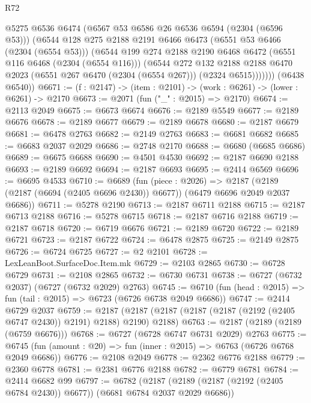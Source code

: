 \begin{lexlean}{R72}
\begin{coremodule}
            @5275
            @6536
            @6474
            (@6567 @53 @6586 @26 @6536 @6594 (@2304 (@6596 @53)))
            (@6544
              @128
              @275
              @2188
              @2191
              @6466
              @6473
              (@6551 @53 @6466 (@2304 (@6554 @53)))
              (@6544
                @199
                @274
                @2188
                @2190
                @6468
                @6472
                (@6551 @116 @6468 (@2304 (@6554 @116)))
                (@6544
                  @272
                  @132
                  @2188
                  @2188
                  @6470
                  @2023
                  (@6551 @267 @6470 (@2304 (@6554 @267)))
                  (@2324 @6515)))))))
      (@6438 @6540))
@6671 := (f : @2147) -> (item : @2101) -> (work : @6261) -> (lower : @6261) -> @2170
@6673 := @2071 (fun ("_" : @2015) => @2170)
@6674 := @2113 @2049
@6675 := @6673 @6674
@6676 := @2189 @5549
@6677 := @2189 @6676
@6678 := @2189 @6677
@6679 := @2189 @6678
@6680 := @2187 @6679
@6681 := @6478 @2763
@6682 := @2149 @2763
@6683 := @6681 @6682
@6685 := @6683 @2037 @2029
@6686 := @2748 @2170
@6688 := @6680 (@6685 @6686)
@6689 := @6675 @6688
@6690 := @4501 @4530
@6692 := @2187 @6690 @2188
@6693 := @2189 @6692
@6694 := @2187 @6693
@6695 := @2414 @6569
@6696 := @6695 @4533
@6710 := @6689
    (fun (piece : @2026) =>
    @2187 (@2189 (@2187 (@6694 (@2405 @6696 @2430)) @6677)) (@6479 @6696 @2049 @2037 @6686))
@6711 := @5278 @2190
@6713 := @2187 @6711 @2188
@6715 := @2187 @6713 @2188
@6716 := @5278 @6715
@6718 := @2187 @6716 @2188
@6719 := @2187 @6718
@6720 := @6719 @6676
@6721 := @2189 @6720
@6722 := @2189 @6721
@6723 := @2187 @6722
@6724 := @6478 @2875
@6725 := @2149 @2875
@6726 := @6724 @6725
@6727 := @2 @2101
@6728 := LexLeanBoot.SurfaceDoc.Item.mk
@6729 := @2103 @2865
@6730 := @6728 @6729
@6731 := @2108 @2865
@6732 := @6730 @6731
@6738 := @6727 (@6732 @2037) (@6727 (@6732 @2029) @2763)
@6745 := @6710 (fun (head : @2015) => fun (tail : @2015) => @6723 (@6726 @6738 @2049 @6686))
@6747 := @2414 @6729 @2037
@6759 := @2187 (@2187 (@2187 (@2187 (@2187 (@2192 (@2405 @6747 @2430)) @2191) @2188) @2190) @2188)
@6763 := @2187 (@2189 (@2189 (@6759 @6676)))
@6768 := @6727 (@6728 @6747 @6731 @2029) @2763
@6775 := @6745 (fun (amount : @20) => fun (inner : @2015) => @6763 (@6726 @6768 @2049 @6686))
@6776 := @2108 @2049
@6778 := @2362 @6776 @2188
@6779 := @2360 @6778
@6781 := @2381 @6776 @2188
@6782 := @6779 @6781
@6784 := @2414 @6682 @99
@6797 := @6782
    (@2187 (@2189 (@2187 (@2192 (@2405 @6784 @2430)) @6677)) (@6681 @6784 @2037 @2029 @6686))

\end{coremodule}
\end{lexlean}

